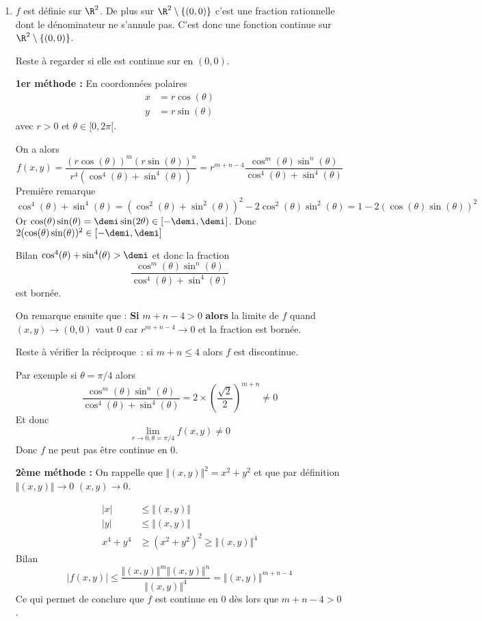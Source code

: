 \documentclass{article}
\begin{document}
\begin{enumerate}
\item $f$ est définie sur $\R^2$. De plus sur $\R^2 \setminus \{(0,0)\}$ c'est une fraction rationnelle dont le dénominateur ne s'annule pas. C'est donc une fonction continue sur $\R^2 \setminus \{(0,0)\}$.

Reste à regarder si elle est continue sur en $(0,0)$.

\textbf{1er méthode :} 
En coordonnées polaires
\begin{align*}
x &= r\cos(\theta)\\
y &= r\sin(\theta)
\end{align*}	
 avec $r>0$ et $\theta \in [0,2\pi[$.
 
On a alors
\[
f(x,y) = \dfrac{(r\cos(\theta))^m(r\sin(\theta))^n}{r^4(\cos^4(\theta)+\sin^4(\theta))}
= r^{m+n-4} \dfrac{\cos^m(\theta)\sin^n(\theta)}{\cos^4(\theta)+\sin^4(\theta)}
\]
Première remarque 
\[
\cos^4(\theta)+\sin^4(\theta) = (\cos^2(\theta) + \sin^2(\theta))^2 - 2\cos^2(\theta)\sin^2(\theta) = 1 - 2(\cos(\theta)\sin(\theta))^2
\]
Or $\cos(\theta)\sin(\theta) = \demi\sin(2\theta) \in [-\demi,\demi]$. Donc $2(\cos(\theta)\sin(\theta))^2 \in  [-\demi,\demi]$

Bilan $\cos^4(\theta)+\sin^4(\theta) > \demi$ et donc la fraction
\[
\dfrac{\cos^m(\theta)\sin^n(\theta)}{\cos^4(\theta)+\sin^4(\theta)}
\] 
est bornée.

On remarque ensuite que : \textbf{Si} $m+n-4 > 0$ \textbf{alors} la limite de $f$ quand $(x,y) \to (0,0)$ vaut $0$ car $r^{m+n-4} \to 0$ et la fraction est bornée.

Reste à vérifier la réciproque~: si $m+n \leq 4$ alors $f$ est discontinue.

Par exemple si $\theta = \pi/4$ alors  
\[
\dfrac{\cos^m(\theta)\sin^n(\theta)}{\cos^4(\theta)+\sin^4(\theta)} = 2 \times \left(\dfrac{\sqrt{2}}{2}\right)^{m+n} \neq 0
\]
Et donc 
\[
\underset{r\to 0, \theta = \pi/4}{\lim} f(x,y) \neq 0
\]
Donc $f$ ne peut pas être continue en $0$.


\textbf{2ème méthode :} On rappelle que $\Vert (x,y) \Vert^2 = x^2 + y^2$ et que par définition $\Vert (x,y) \Vert \to 0$ \ssi $(x,y) \to 0$.
 
 \begin{align*}
 |x| &\leq  \Vert (x,y) \Vert\\
 |y| &\leq  \Vert (x,y) \Vert\\
 x^4+ y^4 &\geq (x^2+y^2)^2 \geq  \Vert (x,y) \Vert^4
 \end{align*}
 Bilan
 \[
\vert f(x,y) \vert  \leq \dfrac{\Vert (x,y) \Vert^m\Vert (x,y) \Vert^n}{\Vert (x,y) \Vert^4} = \Vert (x,y) \Vert^{m+n-4}
 \]
Ce qui permet de conclure que $f$ est continue en $0$ dès lors que $m+n-4 >0$.


\end{enumerate}
\end{document}

